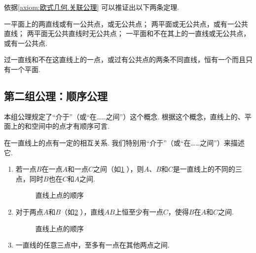 依据\cref{axiom:欧式几何.关联公理} 可以推证出以下两条定理.
\begin{theorem}\label{theorem:欧式几何.定理1}
一平面上的两直线或有一公共点，或无公共点；
两平面或无公共点，或有一公共直线；
两平面无公共直线时无公共点；
一平面和不在其上的一直线或无公共点，或有一公共点.
\end{theorem}

\begin{theorem}\label{theorem:欧式几何.定理2}
过一直线和不在这直线上的一点，或过有公共点的两条不同直线，恒有一个而且只有一个平面.
\end{theorem}

\subsection{第二组公理：顺序公理}
本组公理规定了“介于”（或“在……之间”）这个概念.
根据这个概念，直线上的、平面上的和空间中的点才有顺序可言.
\begin{axiom}[顺序公理I]\label{axiom:欧式几何.顺序公理1}
在一直线上的点有一定的相互关系.
我们特别用“介于”（或“在……之间”）来描述它.
\begin{enumerate}
\item 若一点\(B\)在一点\(A\)和一点\(C\)之间（如\cref{figure:欧式几何.直线上点的顺序1} ），则\(A\)、\(B\)和\(C\)是一直线上的不同的三点，同时\(B\)也在\(C\)和\(A\)之间.
\begin{figure}[ht]
\centering
{}
\caption{直线上点的顺序}
\label{figure:欧式几何.直线上点的顺序1}
\end{figure}

\item 对于两点\(A\)和\(B\)（如\cref{figure:欧式几何.直线上点的顺序2} ），直线\(AB\)上恒至少有一点\(C\)，使得\(B\)在\(A\)和\(C\)之间.
\begin{figure}[ht]
\centering
{}
\caption{直线上点的顺序}
\label{figure:欧式几何.直线上点的顺序2}
\end{figure}

\item 一直线的任意三点中，至多有一点在其他两点之间.
\end{enumerate}
\end{axiom}

